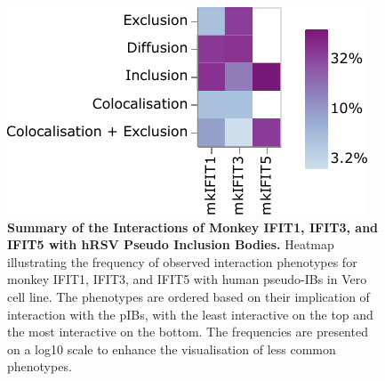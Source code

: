 \begin{figure}
    \centering
    \includegraphics[width=0.6\linewidth]{09. Chapter 4/Figs/heatmap-vero-hnhp-i135.pdf}
    \caption[Summary of the Interactions of Monkey IFIT1, IFIT3, and IFIT5 with hRSV Pseudo Inclusion Bodies.]{\textbf{Summary of the Interactions of Monkey IFIT1, IFIT3, and IFIT5 with hRSV Pseudo Inclusion Bodies.} Heatmap illustrating the frequency of observed interaction phenotypes for monkey IFIT1, IFIT3, and IFIT5 with human pseudo-IBs in Vero cell line. The phenotypes are ordered based on their implication of interaction with the pIBs, with the least interactive on the top and the most interactive on the bottom. The frequencies are presented on a log10 scale to enhance the visualisation of less common phenotypes.}
    \label{fig:Summary of the Interactions of Monkey IFIT1, IFIT3, and IFIT5 with hRSV Pseudo Inclusion Bodies}
\end{figure}

